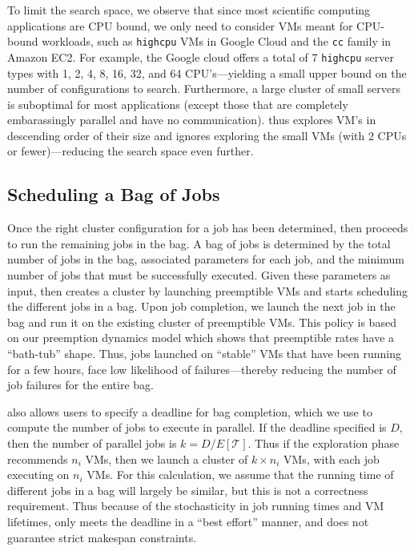 
To limit the search space, we observe that since most scientific computing applications are CPU bound, we only need to consider VMs meant for CPU-bound workloads, such as \texttt{highcpu} VMs in Google Cloud and the \texttt{cc} family in Amazon EC2.
For example, the Google cloud offers a total of 7 \texttt{highcpu} server types with 1, 2, 4, 8, 16, 32, and 64 CPU's---yielding a small upper bound on the number of configurations to search. 
Furthermore, a large cluster of small servers is suboptimal for most applications (except those that are completely embarassingly parallel and have no communication).
\sysname thus explores VM's in descending order of their size and ignores exploring the small VMs (with 2 CPUs or fewer)---reducing the search space even further. 


\vspace*{\subsecspace}
\subsection{Scheduling a Bag of Jobs}


Once the right cluster configuration for a job has been determined, \sysname then proceeds to run the remaining jobs in the bag.
A bag of jobs is determined by the total number of jobs in the bag, associated parameters for each job, and the minimum number of jobs that must be successfully executed.  
Given these parameters as input, \sysname then creates a cluster by launching preemptible VMs and starts scheduling the different jobs in a bag.
Upon job completion, we launch the next job in the bag and run it on the existing cluster of preemptible VMs.
This policy is based on our preemption dynamics model which shows that preemptible rates have a ``bath-tub'' shape.
Thus, jobs launched on ``stable'' VMs that have been running for a few hours, face low likelihood of failures---thereby reducing the number of job failures for the entire bag. 

\sysname also allows users to specify a deadline for bag completion, which we use to compute the number of jobs to execute in parallel.
If the deadline specified is $D$, then the number of parallel jobs is $k=D/E[\mathcal{T}]$.
Thus if the exploration phase recommends $n_i$ VMs, then we launch a cluster of $k\times n_i$ VMs, with each job executing on $n_i$ VMs. 
For this calculation, we assume that the running time of different jobs in a bag will largely be similar, but this is not a correctness requirement.
Thus because of the stochasticity in job running times and VM lifetimes, \sysname only meets the deadline in a ``best effort'' manner, and does not guarantee strict makespan constraints. 

